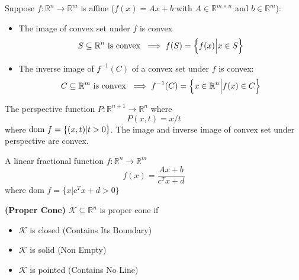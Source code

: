 \begin{proposition}
    Suppose $f:\mathbb{R}^n\rightarrow \mathbb{R}^{m}$ is affine ($f(x) = Ax+b$ with $A\in \mathbb{R}^{m\times n}$ and $b\in \mathbb{R}^m$):
    \begin{itemize}
        \item The image of convex set under $f$ is convex 
        \begin{equation*}
            S\subseteq \mathbb{R}^n \text{ is convex } \implies f(S) = \left\{ f(x) \Big| x\in S \right\}
        \end{equation*}
        \item The inverse image of $f^{-1}(C)$ of a convex set under $f$ is convex:
        \begin{equation*}
            C\subseteq \mathbb{R}^m \text{ is convex } \implies f^{-1}(C) = \left\{ x\in \mathbb{R}^n \Big| f(x) \in C \right\}
        \end{equation*}
    \end{itemize}
\end{proposition}

\begin{proposition}
    The perspective function $P:\mathbb{R}^{n+1}\rightarrow \mathbb{R}^n$ where
    \begin{equation*}
        P(x, t) = x/t
    \end{equation*}
    where $\text{dom } f = \left\{ (x, t) | t > 0 \right\}$. The image and inverse image of convex set under perspective are convex. 
\end{proposition}

\begin{proposition}
    A linear fractional function $f:\mathbb{R}^n\rightarrow \mathbb{R}^m$ 
    \begin{equation*}
        f(x) = \frac{Ax + b}{c^Tx+d}
    \end{equation*}
    where $\text{dom } f = \{ x | c^Tx + d > 0 \}$
\end{proposition}

\begin{definition}{\textbf{(Proper Cone)}}
    $\mathcal{K}\subseteq \mathbb{R}^n$ is proper cone if 
    \begin{itemize}
        \item $ \mathcal{K} $ is closed (Contains Its Boundary)
        \item $\mathcal{K}$ is solid (Non Empty)
        \item $\mathcal{K}$ is pointed (Contains No Line)
    \end{itemize}
\end{definition}


